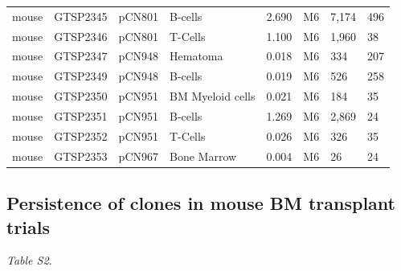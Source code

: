 \documentclass[12pt,]{article}
\begin{document}
\begin{table}[H]
{\begin{tabular}{llllrlll}
mouse & GTSP2345 & pCN801 & B-cells & 2.690 & M6 & 7,174 & 496\\
mouse & GTSP2346 & pCN801 & T-Cells & 1.100 & M6 & 1,960 & 38\\
mouse & GTSP2347 & pCN948 & Hematoma & 0.018 & M6 & 334 & 207\\
mouse & GTSP2349 & pCN948 & B-cells & 0.019 & M6 & 526 & 258\\
mouse & GTSP2350 & pCN951 & BM Myeloid cells & 0.021 & M6 & 184 & 35\\
mouse & GTSP2351 & pCN951 & B-cells & 1.269 & M6 & 2,869 & 24\\
mouse & GTSP2352 & pCN951 & T-Cells & 0.026 & M6 & 326 & 35\\
mouse & GTSP2353 & pCN967 & Bone Marrow & 0.004 & M6 & 26 & 24\\
\bottomrule
\end{tabular}}
\end{table}

\newpage

\subsection{Persistence of clones in mouse BM transplant
trials}\label{persistence-of-clones-in-mouse-bm-transplant-trials}

\emph{Table S2.}
\end{document}
